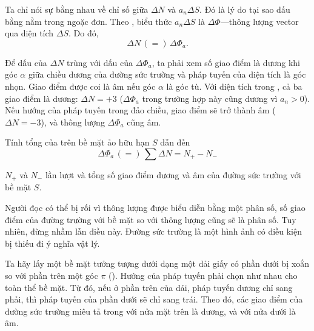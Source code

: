 \noindent
Ta chỉ nói sự bằng nhau về chỉ số giữa $\Delta{N}$ và $a_n\Delta{S}$. Đó là lý do tại sao dấu bằng nằm trong ngoặc đơn. Theo , biểu thức $a_n\Delta{S}$ là $\Delta{\Phi}$---thông lượng vector qua diện tích $\Delta{S}$. Do đó,
\begin{equation}\label{eq:1_75}
	\Delta{N}\, (=)\, \Delta{\Phi}_a.
\end{equation}

Để dấu của $\Delta{N}$ trùng với dấu của $\Delta{\Phi}_a$, ta phải xem số giao điểm là dương khi góc $\alpha$ giữa chiều dương của đường sức trường và pháp tuyến của diện tích là góc nhọn. Giao điểm được coi là âm nếu góc $\alpha$ là góc tù. Với diện tích trong , cả ba giao điểm là dương: $\Delta{N}=+3$ ($\Delta{\Phi}_a$ trong trường hợp này cũng dương vì $a_n>0$). Nếu hướng của pháp tuyến trong  đảo chiều, giao điểm sẽ trở thành âm ($\Delta{N}=-3$), và thông lượng $\Delta{\Phi}_a$ cũng âm.

Tính tổng của  trên bề mặt ảo hữu hạn $S$ dẫn đến
\begin{equation}\label{eq:1_76}
	\Delta{\Phi}_a\, (=)\, \sum\Delta{N} = N_+ - N_-
\end{equation}

\noindent
$N_+$ và $N_-$ lần lượt và tổng số giao điểm dương và âm của đường sức trường với bề mặt $S$.

Người đọc có thể bị rối vì thông lượng được biểu diễn bằng một phân số, số giao điểm của đường trường với bề mặt so với thông lượng cũng sẽ là phân số. Tuy nhiên, đừng nhầm lẫn điều này. Đường sức trường là một hình ảnh có điều kiện bị thiếu đi ý nghĩa vật lý.

Ta hãy lấy một bề mặt tưởng tượng dưới dạng một dải giấy có phần dưới bị xoắn so với phần trên một góc $\pi$ (). Hướng của pháp tuyến phải chọn như nhau cho toàn thể bề mặt. Từ đó, nếu ở phần trên của dải, pháp tuyến dương chỉ sang phải, thì pháp tuyến của phần dưới sẽ chỉ sang trái. Theo đó, các giao điểm của đường sức trường miêu tả trong  với nửa mặt trên là dương, và với nửa dưới là âm.

